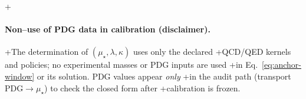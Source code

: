 \documentclass[epjc3]{svjour3}
\begin{document}
+\paragraph{Non–use of PDG data in calibration (disclaimer).}
+The determination of $(\mu_\star,\lambda,\kappa)$ uses only the declared
+QCD/QED kernels and policies; no experimental masses or PDG inputs are used
+in Eq.~\eqref{eq:anchor-window} or its solution. PDG values appear \emph{only}
+in the audit path (transport PDG$\to\mu_\star$) to check the closed form after
+calibration is frozen.
\end{document}
